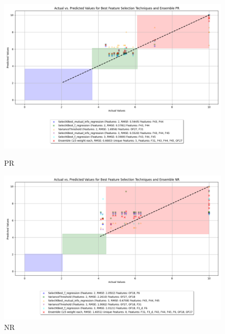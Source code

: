 \begin{figure}[H]
    \centering
    \begin{minipage}{0.45\textwidth}
        \centering
        \includegraphics[width=\linewidth]{reg_section_specific/images_reg_featred_ensemble/actual_vs_predicted_smallest_feature_selection_and_ensemble_PR.png}
        \caption{PR}
        \label{fig_reg_spec:pr_reg_featred_smallest_ensemble}
    \end{minipage}\hfill
    \begin{minipage}{0.45\textwidth}
        \centering
        \includegraphics[width=\linewidth]{reg_section_specific/images_reg_featred_ensemble/actual_vs_predicted_smallest_feature_selection_and_ensemble_NR.png}
        \caption{NR}
        \label{fig_reg_spec:nr_reg_featred_smallest_ensemble}
    \end{minipage}
\end{figure}

